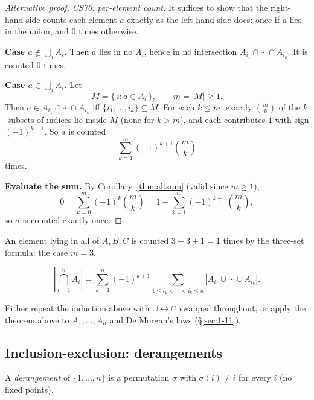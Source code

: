 \documentclass[11pt]{article}
\begin{document}
\begin{proof}[Alternative proof, CS70: per-element count]
It suffices to show that the right-hand side counts each element $a$ exactly as the left-hand side does: once if $a$ lies in the union, and $0$ times otherwise.

\medskip
\textbf{Case $a\notin\bigcup_i A_i$.} Then $a$ lies in no $A_i$, hence in no intersection $A_{i_1}\cap\cdots\cap A_{i_k}$. It is counted $0$ times.

\medskip
\textbf{Case $a\in\bigcup_i A_i$.} Let
\[
M=\{\,i : a\in A_i\,\},\qquad m=|M|\ge1.
\]
Then $a\in A_{i_1}\cap\cdots\cap A_{i_k}$ iff $\{i_1,\dots,i_k\}\subseteq M$. For each $k\le m$, exactly $\binom{m}{k}$ of the $k$-subsets of indices lie inside $M$ (none for $k>m$), and each contributes $1$ with sign $(-1)^{k+1}$. So $a$ is counted
\[
\sum_{k=1}^{m}(-1)^{k+1}\binom{m}{k}
\]
times.

\medskip
\textbf{Evaluate the sum.} By Corollary~\ref{thm:altsum} (valid since $m\ge1$),
\[
0=\sum_{k=0}^{m}(-1)^k\binom{m}{k} = 1-\sum_{k=1}^{m}(-1)^{k+1}\binom{m}{k},
\]
so $a$ is counted exactly once.
\end{proof}
\begin{example}
An element lying in all of $A,B,C$ is counted $3-3+1=1$ times by the three-set formula: the case $m=3$.
\end{example}

\begin{theorem}
\[
\left|\bigcap_{i=1}^n A_i\right| = \sum_{k=1}^n (-1)^{k+1} \sum_{1\le i_1<\cdots<i_k\le n} |A_{i_1}\cup\cdots\cup A_{i_k}|.
\]
\end{theorem}
\begin{note}
Either repeat the induction above with $\cup\leftrightarrow\cap$ swapped throughout, or apply the theorem above to $\overline{A_1},\dots,\overline{A_n}$ and De Morgan's laws (\S\ref{sec:1-11}).
\end{note}

\subsection{Inclusion-exclusion: derangements}
\label{sec:8-4}

\begin{definition}[Derangement]
A \emph{derangement} of $\{1,\dots,n\}$ is a permutation $\sigma$ with $\sigma(i)\neq i$ for every $i$ (no fixed points).
\end{definition}
\end{document}
